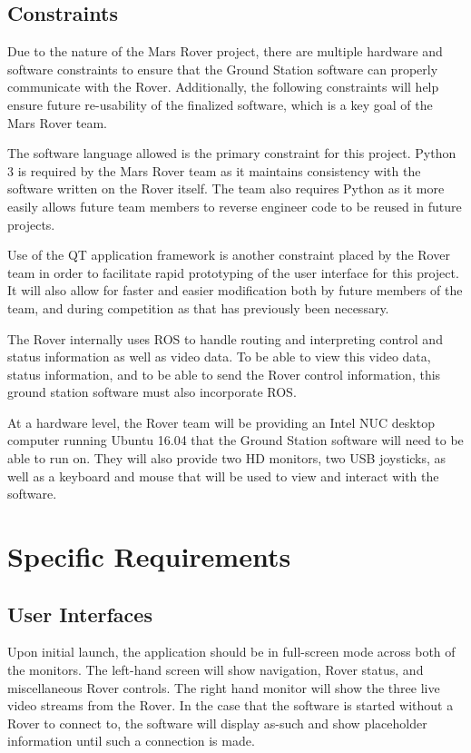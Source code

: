 \documentclass[onecolumn, draftclsnofoot, 10pt, compsoc]{IEEEtran}
\begin{document}
\subsection{Constraints}
Due to the nature of the Mars Rover project, there are multiple hardware and software constraints to ensure that the Ground Station software can properly communicate with the Rover. 
Additionally, the following constraints will help ensure future re-usability of the finalized software, which is a key goal of the Mars Rover team. 
\par
The software language allowed is the primary constraint for this project. 
Python 3 is required by the Mars Rover team as it maintains consistency with the software written on the Rover itself. 
The team also requires Python as it more easily allows future team members to reverse engineer code to be reused in future projects.
\par
Use of the QT application framework is another constraint placed by the Rover team in order to facilitate rapid prototyping of the user interface for this project. 
It will also allow for faster and easier modification both by future members of the team, and during competition as that has previously been necessary.
\par
The Rover internally uses ROS to handle routing and interpreting control and status information as well as video data. To be able to view this video data, status information, and to be able to send the Rover control information, this ground station software must also incorporate ROS.
\par
At a hardware level, the Rover team will be providing an Intel NUC desktop computer running Ubuntu 16.04 that the Ground Station software will need to be able to run on.
They will also provide two HD monitors, two USB joysticks, as well as a keyboard and mouse that will be used to view and interact with the software.


\section{Specific Requirements}
\subsection{User Interfaces}
Upon initial launch, the application should be in full-screen mode across both of the monitors. 
The left-hand screen will show navigation, Rover status, and miscellaneous Rover controls. 
The right hand monitor will show the three live video streams from the Rover. 
In the case that the software is started without a Rover to connect to, the software will display as-such and show placeholder information until such a connection is made.
\end{document}
